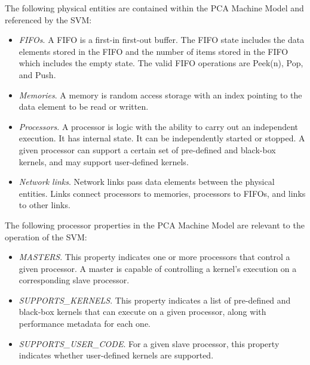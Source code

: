 
The following physical entities are contained within the PCA Machine
Model and referenced by the SVM:

\begin{itemize}

\item {\it FIFOs}.  A FIFO is a first-in first-out buffer.  The FIFO
state includes the data elements stored in the FIFO and the number of
items stored in the FIFO which includes the empty state.  The valid
FIFO operations are Peek(n), Pop, and Push.

\item {\it Memories}. A memory is random access storage with an index
pointing to the data element to be read or written.

\item {\it Processors}. A processor is logic with the ability to carry
out an independent execution.  It has internal state.  It can be
independently started or stopped.  A given processor can support a
certain set of pre-defined and black-box kernels, and may support
user-defined kernels.

\item {\it Network links}. Network links pass data elements between
the physical entities.  Links connect processors to memories,
processors to FIFOs, and links to other links.

\end{itemize}


The following processor properties in the PCA Machine Model are
relevant to the operation of the SVM:

\begin{itemize}

\item {\it MASTERS}.  This property indicates one or more processors
that control a given processor.  A master is capable of controlling a
kernel's execution on a corresponding slave processor.


\item {\it SUPPORTS\_KERNELS}.  This property indicates a list of
pre-defined and black-box kernels that can execute on a given
processor, along with performance metadata for each one.

\item {\it SUPPORTS\_USER\_CODE}.  For a given slave processor, this
property indicates whether user-defined kernels are supported.

\end{itemize}

